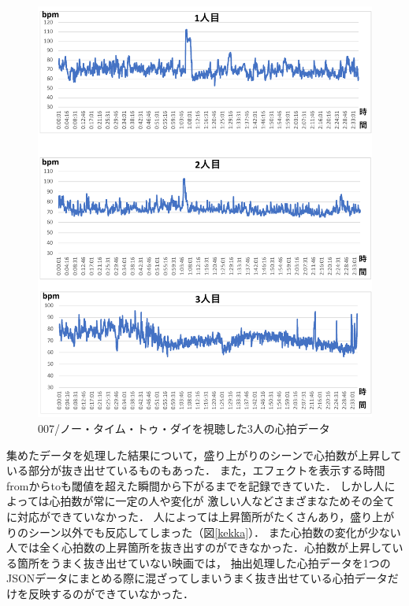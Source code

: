 \begin{figure}[H]
    \centering
    \includegraphics[width=14cm]{images/chapter4/nolimitto.pdf}
    \caption{007/ノー・タイム・トゥ・ダイを視聴した3人の心拍データ}
    \label{nolimit}
\end{figure}

集めたデータを処理した結果について，盛り上がりのシーンで心拍数が上昇している部分が抜き出せているものもあった．
また，エフェクトを表示する時間fromからtoも閾値を超えた瞬間から下がるまでを記録できていた．
しかし人によっては心拍数が常に一定の人や変化が 激しい人などさまざまなためその全てに対応ができていなかった．
人によっては上昇箇所がたくさんあり，盛り上がりのシーン以外でも反応してしまった（図\ref{kekka}）．
また心拍数の変化が少ない人では全く心拍数の上昇箇所を抜き出すのができなかった．心拍数が上昇している箇所をうまく抜き出せていない映画では，
抽出処理した心拍データを1つのJSONデータにまとめる際に混ざってしまいうまく抜き出せている心拍データだけを反映するのができていなかった．



